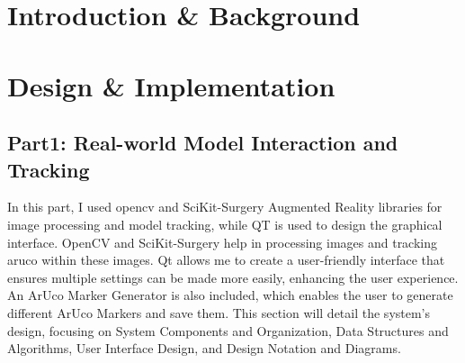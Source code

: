\documentclass[12pt]{article}
\begin{document}
\section{Introduction \& Background}

 

\section{Design \& Implementation}

\subsection{Part1: Real-world Model Interaction and Tracking}

In this part, I used \gls{opencv}\cite{opencv_library} and SciKit-Surgery Augmented Reality\cite{Thompson_SciKit-Surgery_Compact_Libraries_2020} libraries for image
processing and  model tracking, while \gls{QT}\cite{QtWebsite} is used to design the graphical interface. OpenCV and SciKit-Surgery help in processing images
and tracking \gls{aruco}\cite{1467495} within these images. Qt allows me to create a user-friendly interface that ensures multiple settings can be made more easily, enhancing the user experience.
An ArUco Marker Generator is also included, which enables the user to generate different ArUco Markers and save them.
This section will detail the system's design, focusing on System Components and Organization, Data Structures and Algorithms,
User Interface Design, and Design Notation and Diagrams.
\end{document}
